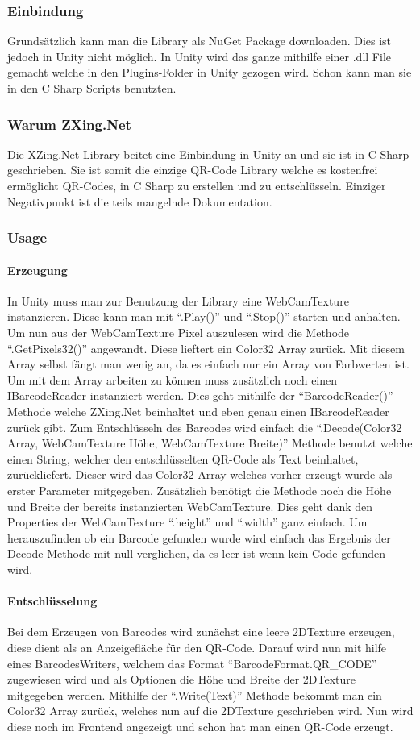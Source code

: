 \subsubsection{Einbindung}
Grundsätzlich kann man die Library als NuGet Package downloaden. Dies ist jedoch in Unity nicht möglich. In Unity wird das ganze mithilfe einer .dll File gemacht welche in den Plugins-Folder in Unity gezogen wird. Schon kann man sie in den C Sharp Scripts benutzten.
\subsubsection{Warum ZXing.Net}
Die XZing.Net Library beitet eine Einbindung in Unity an und sie ist in C Sharp geschrieben. Sie ist  somit die einzige QR-Code Library welche es kostenfrei ermöglicht QR-Codes, in C Sharp zu erstellen und zu entschlüsseln. Einziger Negativpunkt ist die teils mangelnde Dokumentation.
\subsubsection{Usage}
\paragraph{Erzeugung}
In Unity muss man zur Benutzung der Library eine WebCamTexture instanzieren. Diese kann man mit “.Play()” und “.Stop()” starten und anhalten. Um nun aus der WebCamTexture Pixel auszulesen wird die Methode “.GetPixels32()” angewandt. Diese lieftert ein Color32 Array zurück. Mit diesem Array selbst fängt man wenig an, da es einfach nur ein Array von Farbwerten ist. Um mit dem Array arbeiten zu können muss zusätzlich noch einen IBarcodeReader instanziert werden. Dies geht mithilfe der “BarcodeReader()” Methode welche ZXing.Net beinhaltet und eben genau einen IBarcodeReader zurück gibt. Zum Entschlüsseln des Barcodes wird einfach die “.Decode(Color32 Array, WebCamTexture Höhe, WebCamTexture Breite)” Methode benutzt welche einen String, welcher den entschlüsselten QR-Code als Text beinhaltet, zurückliefert. Dieser wird das Color32 Array welches vorher erzeugt wurde als erster Parameter mitgegeben. Zusätzlich benötigt die Methode noch die Höhe und Breite der bereits instanzierten WebCamTexture. Dies geht dank den Properties der WebCamTexture “.height” und “.width”  ganz einfach. Um herauszufinden ob ein Barcode gefunden wurde wird einfach das Ergebnis der Decode Methode mit null verglichen, da es leer ist wenn kein Code gefunden wird.
\paragraph{Entschlüsselung}
Bei dem Erzeugen von Barcodes wird zunächst eine leere 2DTexture erzeugen, diese dient als an Anzeigefläche für den QR-Code. Darauf wird nun mit hilfe eines BarcodesWriters, welchem das Format “BarcodeFormat.QR\_CODE” zugewiesen wird und als Optionen die Höhe und Breite der 2DTexture mitgegeben werden. Mithilfe der “.Write(Text)” Methode bekommt man ein Color32 Array zurück, welches nun auf die 2DTexture geschrieben wird.
Nun wird diese noch im Frontend angezeigt und schon hat man einen QR-Code erzeugt.
